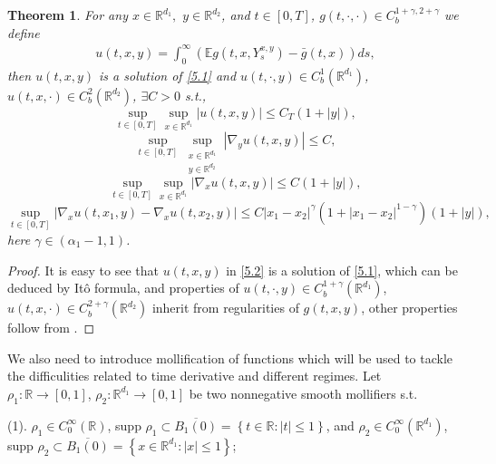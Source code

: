 \documentclass[11pt,reqno]{amsart}
\newtheorem{theorem}{\indent Theorem}[section]
\numberwithin{equation}{section}
\begin{document}
\begin{theorem}\label{T51}
	For any  $x\in \mathbb{R}^{d_{1}}, $  $y\in \mathbb{R}^{d_{2}} $, and $t\in [0,T]$, $g(t,\cdot,\cdot)\in C_{b}^{1+\gamma, 2+\gamma}$ we define 
	\begin{equation}\label{5.2}
		\begin{split}
			u(t,x,y)=\int^{\infty}_{0}\left( \mathbb{E}g(t,x,Y_{s}^{x,y})-\bar{g}(t,x)\right) ds,
		\end{split}
	\end{equation}
	then $u(t,x,y)$ is a solution of \eqref{5.1} and  $u(t,\cdot,y)\in C_{b}^{1}(\mathbb{R}^{d_{1}})$, $u(t,x,\cdot)\in C_{b}^{2}(\mathbb{R}^{d_{2}})$, $\exists C>0$ s.t.,
	\begin{equation}\label{5.3}
			\sup_{t\in [0,T]}\sup_{x\in \mathbb{R}^{d_{1}}}|u(t,x,y)|\leq C_{T}(1+|y|),
	\end{equation}
	\begin{equation}\label{5.4}
		\sup_{t\in [0,T]}\sup_{\substack{x\in \mathbb{R}^{d_{1}}\\ y\in \mathbb{R}^{d_{2}}}}|\nabla_{y}u(t,x,y)|\leq C,
	\end{equation}
	\begin{equation}\label{5.5}
		\sup_{t\in [0,T]}\sup_{x\in \mathbb{R}^{d_{1}}}|\nabla_{x}u(t,x,y)|\leq C(1+|y|),
	\end{equation}
	\begin{equation}\label{5.6}
		\sup_{t\in [0,T]}|\nabla_{x}u(t,x_{1},y)-\nabla_{x}u(t,x_{2},y)|\leq C|x_{1}-x_{2}|^{\gamma}(1+|x_{1}-x_{2}|^{1-\gamma})(1+|y|),
	\end{equation}
	here $\gamma\in (\alpha_{1}-1,1)$.
\end{theorem}
\begin{proof}
	It is easy to see that $u(t,x,y)$ in \eqref{5.2} is a solution of \eqref{5.1}, which can be deduced by It\^{o} formula, and properties of  $u(t,\cdot,y)\in C_{b}^{1+\gamma}(\mathbb{R}^{d_{1}})$, $u(t,x,\cdot)\in C_{b}^{2+\gamma}(\mathbb{R}^{d_{2}})$ inherit from  regularities of $g(t,x,y)$, other properties follow from \cite[Proposition 3.3]{SXX}.
\end{proof}

We also need to introduce  mollification of functions which will be used to tackle the difficulities related to time derivative and different regimes. Let $\rho_{1}:\mathbb{R}\rightarrow [0,1]$, $\rho_{2}: \mathbb{R}^{ d_{1}}\rightarrow [0,1]$ be two nonnegative smooth mollifiers s.t. 

(1). $\rho_{1}\in C_{0}^{\infty}(\mathbb{R})$, supp $  \rho_{1}\subset \overline{B_{1}(0)}=\left\lbrace t\in \mathbb{R}:|t|\leq 1 \right\rbrace $, and $ \rho_{2}\in C_{0}^{\infty}(\mathbb{R}^{ d_{1}})$, supp $  \rho_{2}\subset \overline{B_{1}(0)}=\left\lbrace x\in \mathbb{R}^{ d_{1}}:|x|\leq 1 \right\rbrace $;
\end{document}
